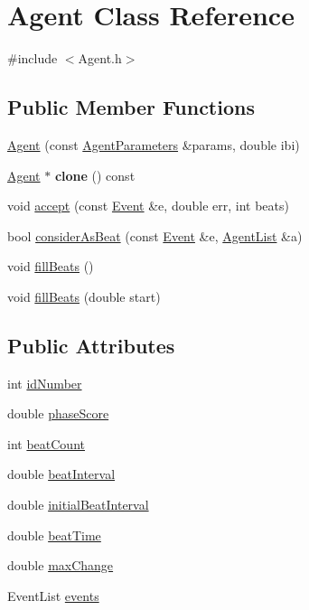 \hypertarget{class_agent}{}\section{Agent Class Reference}
\label{class_agent}


{\ttfamily \#include $<$Agent.\+h$>$}

\subsection*{Public Member Functions}
\begin{DoxyCompactItemize}
\item 
\hyperlink{class_agent_a4c3a0b0e41859d59e55d087c2396baa4}{Agent} (const \hyperlink{class_agent_parameters}{Agent\+Parameters} \&params, double ibi)
\item 
\mbox{\label{class_agent_a111c0107646bc0fe5f4815ca8d229512}} 
\hyperlink{class_agent}{Agent} $\ast$ {\bfseries clone} () const
\item 
void \hyperlink{class_agent_a64b1bca4fe422141a348c20c5831a16d}{accept} (const \hyperlink{struct_event}{Event} \&e, double err, int beats)
\item 
bool \hyperlink{class_agent_a7aae45009593ec7febcf3c61909a724a}{consider\+As\+Beat} (const \hyperlink{struct_event}{Event} \&e, \hyperlink{class_agent_list}{Agent\+List} \&a)
\item 
void \hyperlink{class_agent_a0b45b44b745b3234c117d356de7b299c}{fill\+Beats} ()
\item 
void \hyperlink{class_agent_a1eedd701cb0b8551d6642afb710ba2a1}{fill\+Beats} (double start)
\end{DoxyCompactItemize}
\subsection*{Public Attributes}
\begin{DoxyCompactItemize}
\item 
int \hyperlink{class_agent_ac857e9fc1a2d40aa8c488c2b0892f796}{id\+Number}
\item 
double \hyperlink{class_agent_a6f12ce0139e8709d407fd20963b84d2f}{phase\+Score}
\item 
int \hyperlink{class_agent_abafab4395f0ebf00ca08cdffe8a87705}{beat\+Count}
\item 
double \hyperlink{class_agent_aa6ce02ae70357fef9fa397c2d129cb72}{beat\+Interval}
\item 
double \hyperlink{class_agent_ac6cfc0361e141992752f55ad4b3671d5}{initial\+Beat\+Interval}
\item 
double \hyperlink{class_agent_acc4850f7dcc7d04f56a770629282c551}{beat\+Time}
\item 
double \hyperlink{class_agent_a5aa8ad248a3aceecec676b89a0eb3791}{max\+Change}
\item 
Event\+List \hyperlink{class_agent_a32dd69961705fcd29f725ebf2a2e81b4}{events}
\end{DoxyCompactItemize}


